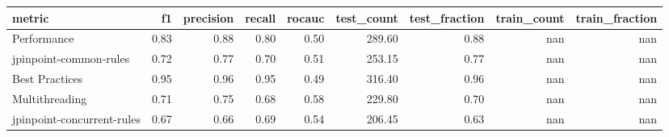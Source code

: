 \begin{tabular}{lrrrrrrrr}
\toprule
metric &   f1 &  precision &  recall &  rocauc &  test\_count &  test\_fraction &  train\_count &  train\_fraction \\
\midrule
Performance                & 0.83 &       0.88 &    0.80 &    0.50 &      289.60 &           0.88 &          nan &             nan \\
jpinpoint-common-rules     & 0.72 &       0.77 &    0.70 &    0.51 &      253.15 &           0.77 &          nan &             nan \\
Best Practices             & 0.95 &       0.96 &    0.95 &    0.49 &      316.40 &           0.96 &          nan &             nan \\
Multithreading             & 0.71 &       0.75 &    0.68 &    0.58 &      229.80 &           0.70 &          nan &             nan \\
jpinpoint-concurrent-rules & 0.67 &       0.66 &    0.69 &    0.54 &      206.45 &           0.63 &          nan &             nan \\
\bottomrule
\end{tabular}
